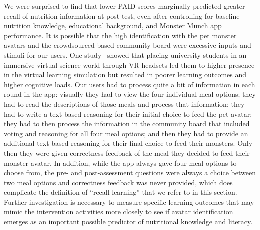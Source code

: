 
We were surprised to find that lower PAID scores marginally predicted greater recall of nutrition information at post-test, even after controlling for baseline nutrition knowledge, educational background, and Monster Munch app performance. It is possible that the high identification with the pet monster avatars and the crowdsourced-based community board were excessive inputs and stimuli for our users. One study~\cite{makransky2019adding} showed that placing university students in an immersive virtual science world through VR headsets led them to higher presence in the virtual learning simulation but resulted in poorer learning outcomes and higher cognitive loads. Our users had to process quite a bit of information in each round in the app: visually they had to view the four individual meal options; they had to read the descriptions of those meals and process that information; they had to write a text-based reasoning for their initial choice to feed the pet avatar; they had to then process the information in the community board that included voting and reasoning for all four meal options; and then they had to provide an additional text-based reasoning for their final choice to feed their monsters. Only then they were given correctness feedback of the meal they decided to feed their monster avatar. In addition, while the app always gave four meal options to choose from, the pre- and post-assessment questions were always a choice between two meal options and correctness feedback was never provided, which does complicate the definition of ``recall learning'' that we refer to in this section. Further investigation is necessary to measure specific learning outcomes that may mimic the intervention activities more closely to see if avatar identification emerges as an important possible predictor of nutritional knowledge and literacy.



